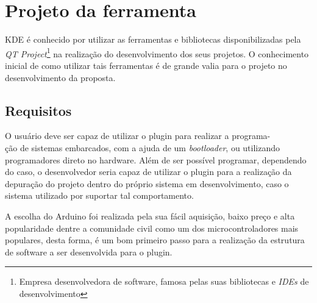 \chapter{Projeto da ferramenta}

KDE é conhecido por utilizar as ferramentas e bibliotecas disponibilizadas pela \textit{QT Project}\footnote{Empresa desenvolvedora  de software, famosa pelas suas bibliotecas e \textit{IDEs} de desenvolvimento} na realização do desenvolvimento dos seus projetos. O conhecimento inicial de como utilizar tais ferramentas é de grande valia para o projeto no desenvolvimento da proposta.


\section{Requisitos}

O usuário deve ser capaz de utilizar o plugin para realizar a programa-\\ção de sistemas embarcados, com a ajuda de um \textit{bootloader}, ou utilizando programadores direto no hardware. Além de ser possível programar, dependendo do caso, o desenvolvedor seria capaz de utilizar o plugin para a realização da depuração do projeto dentro do próprio sistema em desenvolvimento, caso o sistema utilizado por suportar tal comportamento.

A escolha do Arduino foi realizada pela sua fácil aquisição, baixo preço e alta popularidade dentre a comunidade civil como um dos microcontroladores mais populares, desta forma, é um bom primeiro passo para a realização da estrutura de software a ser desenvolvida para o plugin.

